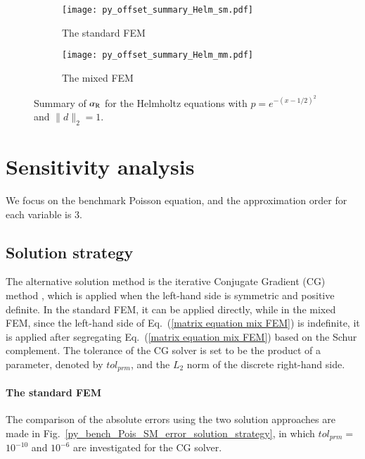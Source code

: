 \documentclass[review,3p]{elsarticle}
\begin{document}
\begin{figure}[!ht]
	\hspace{2.5cm}
    \begin{subfigure}{5.4cm}
        \texttt{[image: py\_offset\_summary\_Helm\_sm.pdf]}
        \caption{The standard FEM}
        \label{Fig:py_offset_summary_Helm_sm}
    \end{subfigure}
    \hspace{-0.2cm}
    \begin{subfigure}{5.4cm}
        \texttt{[image: py\_offset\_summary\_Helm\_mm.pdf]}
        \caption{The mixed FEM}
        \label{Fig:py_offset_summary_Helm_mm}
    \end{subfigure}
\caption{Summary of $\alpha_{\rm R}$ for the Helmholtz equations with $p=e^{-{(x-1/2)^2}}$ and $\|d\|_2=1$.}
\label{Fig:py_offset_summary_Helm}
\end{figure}

\section{Sensitivity analysis}       \label{section_sensitivity}


We focus on the benchmark Poisson equation, and the approximation order for each variable is 3.


\subsection{Solution strategy}		\label{section_solver}

The alternative solution method is the iterative Conjugate Gradient (CG) method \cite{ginsburg1963cg}, which is applied when the left-hand side is symmetric and positive definite.
In the standard FEM, it can be applied directly, while in the mixed FEM, since the left-hand side of Eq.~(\ref{matrix equation mix FEM}) is indefinite, it is applied after segregating Eq.~(\ref{matrix equation mix FEM}) based on the Schur complement.
The tolerance of the CG solver is set to be the product of a parameter, denoted by $tol_{prm}$, and the $L_2$ norm of the discrete right-hand side.

\paragraph{The standard FEM}

The comparison of the absolute errors using the two solution approaches are made in Fig.~\ref{py_bench_Pois_SM_error_solution_strategy}, in which $tol_{prm}=$ $10^{-10}$ and $10^{-6}$ are investigated for the CG solver.
\end{document}

